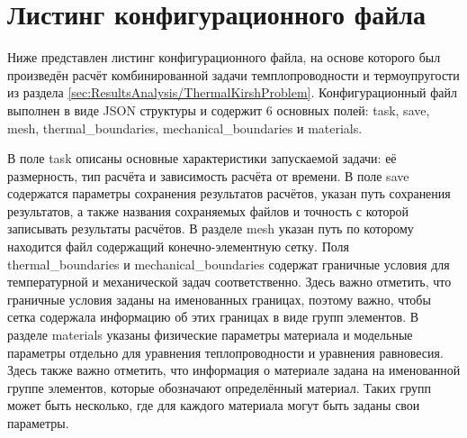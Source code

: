 \chapter{Листинг конфигурационного файла}\label{app:A}

Ниже представлен листинг конфигурационного файла, на основе которого был произведён расчёт комбинированной задачи темплопроводности и термоупругости из раздела \ref{sec:ResultsAnalysis/ThermalKirshProblem}. Конфигурационный файл выполнен в виде JSON структуры и содержит 6 основных полей: task, save, mesh, thermal\_boundaries, mechanical\_boundaries и materials.

В поле task описаны основные характеристики запускаемой задачи: её размерность, тип расчёта и зависимость расчёта от времени. В поле save содержатся параметры сохранения результатов расчётов, указан путь сохранения результатов, а также названия сохраняемых файлов и точность с которой записывать результаты расчётов. В разделе mesh указан путь по которому находится файл содержащий конечно-элементную сетку. Поля thermal\_boundaries и mechanical\_boundaries содержат граничные условия для температурной и механической задач соответственно. Здесь важно отметить, что граничные условия заданы на именованных границах, поэтому важно, чтобы сетка содержала информацию об этих границах в виде групп элементов. В разделе materials указаны физические параметры материала и модельные параметры отдельно для уравнения теплопроводности и уравнения равновесия. Здесь также важно отметить, что информация о материале задана на именованной группе элементов, которые обозначают определённый материал. Таких групп может быть несколько, где для каждого материала могут быть заданы свои параметры.

\begingroup
\captiondelim{ } %

\endgroup
